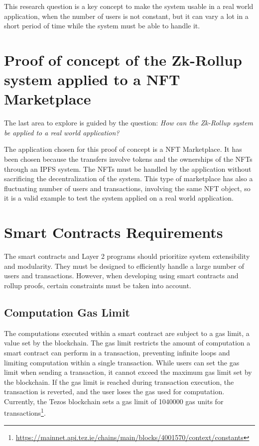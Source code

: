 This research question is a key concept to make the system usable in a real world application, when the number of users is not constant, but it can vary a lot in a short period of time while the system must be able to handle it.

\section{Proof of concept of the Zk-Rollup system applied to a NFT Marketplace}
The last area to explore is guided by the question: \textit{How can the Zk-Rollup system be applied to a real world application?}

The application chosen for this proof of concept is a NFT Marketplace. It has been chosen because the transfers involve tokens and the ownerships of the NFTs through an IPFS system. The NFTs must be handled by the application without sacrificing the decentralization of the system. This type of marketplace has also a fluctuating number of users and transactions, involving the same NFT object, so it is a valid example to test the system applied on a real world application.

\section{Smart Contracts Requirements}

The smart contracts and Layer 2 programs should prioritize system extensibility and modularity. They must be designed to efficiently handle a large number of users and transactions. However, when developing using smart contracts and rollup proofs, certain constraints must be taken into account.

\subsection{Computation Gas Limit \label{subsec:gasLimit}}

The computations executed within a smart contract are subject to a gas limit, a value set by the blockchain. The gas limit restricts the amount of computation a smart contract can perform in a transaction, preventing infinite loops and limiting computation within a single transaction. While users can set the gas limit when sending a transaction, it cannot exceed the maximum gas limit set by the blockchain. If the gas limit is reached during transaction execution, the transaction is reverted, and the user loses the gas used for computation. Currently, the Tezos blockchain sets a gas limit of 1040000 gas units for transactions\footnote{\url{https://mainnet.api.tez.ie/chains/main/blocks/4001570/context/constants}}.

